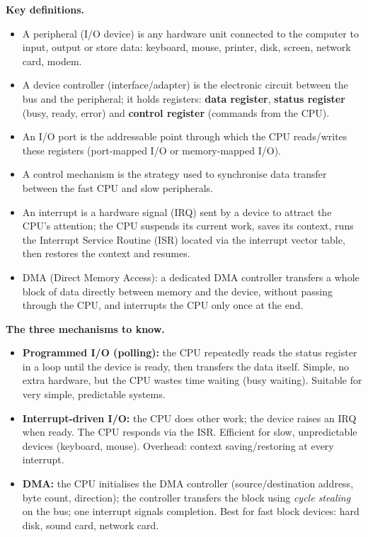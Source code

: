 \documentclass[11pt]{article}
\newcommand{\cle}[1]{{\popxbold\color{popdark}#1}}
\begin{document}
\begin{bilan}
\textbf{Key definitions.}
\begin{itemize}
\item A \cle{peripheral} (I/O device) is any hardware unit connected to the computer to input, output or store data: keyboard, mouse, printer, disk, screen, network card, modem.
\item A \cle{device controller} (interface/adapter) is the electronic circuit between the bus and the peripheral; it holds \cle{registers}: \textbf{data register}, \textbf{status register} (busy, ready, error) and \textbf{control register} (commands from the CPU).
\item An \cle{I/O port} is the addressable point through which the CPU reads/writes these registers (port-mapped I/O or memory-mapped I/O).
\item A \cle{control mechanism} is the strategy used to synchronise data transfer between the fast CPU and slow peripherals.
\item An \cle{interrupt} is a hardware signal (IRQ) sent by a device to attract the CPU's attention; the CPU suspends its current work, saves its context, runs the \cle{Interrupt Service Routine} (ISR) located via the \cle{interrupt vector table}, then restores the context and resumes.
\item \cle{DMA} (Direct Memory Access): a dedicated \cle{DMA controller} transfers a whole block of data directly between memory and the device, without passing through the CPU, and interrupts the CPU only once at the end.
\end{itemize}

\textbf{The three mechanisms to know.}
\begin{itemize}
\item \textbf{Programmed I/O (polling):} the CPU repeatedly reads the status register in a loop until the device is ready, then transfers the data itself. Simple, no extra hardware, but the CPU wastes time waiting (busy waiting). Suitable for very simple, predictable systems.
\item \textbf{Interrupt-driven I/O:} the CPU does other work; the device raises an IRQ when ready. The CPU responds via the ISR. Efficient for slow, unpredictable devices (keyboard, mouse). Overhead: context saving/restoring at every interrupt.
\item \textbf{DMA:} the CPU initialises the DMA controller (source/destination address, byte count, direction); the controller transfers the block using \emph{cycle stealing} on the bus; one interrupt signals completion. Best for fast block devices: hard disk, sound card, network card.
\end{itemize}


\end{bilan}
\end{document}
